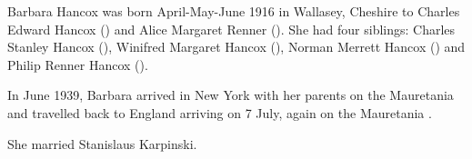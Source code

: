
Barbara Hancox was born April-May-June 1916 in Wallasey, Cheshire to Charles Edward Hancox () and Alice Margaret Renner ()\cite{BarbaraHancoxBirth}.  She had four siblings: Charles Stanley Hancox (), Winifred Margaret Hancox (), Norman Merrett Hancox () and Philip Renner Hancox ().

In June 1939, Barbara arrived in New York with her parents on the Mauretania  and travelled back to England arriving on 7 July, again on the Mauretania \cite{BarbaraHancoxTravel}.

She married Stanislaus Karpinski.
